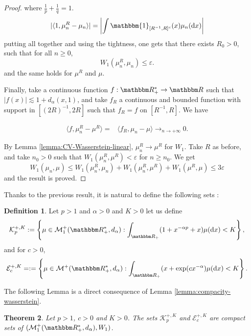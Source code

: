 \documentclass[a4paper,11pt, reqno]{amsart}
\newcommand{\cE}{\mathcal{E}}	\newcommand{\EE}{\mathbbm{E}}
\newcommand{\cK}{\mathcal{K}}	\newcommand{\KK}{\mathbbm{K}}
\newcommand{\cM}{\mathcal{M}}	\newcommand{\MM}{\mathbbm{M}}
\newcommand{\eps}{\varepsilon}
\newcommand{\dd}{\mathop{}\!\mathrm{d}}
\newcommand{\1}{\mathbbm{1}}
\newcommand{\assign}{:=}
\theoremstyle{plain}
\newtheorem{theorem}{Theorem}[section]
\theoremstyle{definition}
\newtheorem{definition}[theorem]{Definition}
\begin{document}
\begin{proof}
  where $\frac{1}{p} + \frac{1}{q} = 1$.
  \[ | \langle 1, \mu_n^R - \mu_n \rangle | = \left| \int \1_{[R^{-
     1}, R]^c} (x) \mu_n (\dd x) \right| \]
  putting all together and using the tightness, one gets that there exists
  $R_0 > 0$, such that for all $n \ge 0$,
  \[ W_1 (\mu_n^R, \mu_n) \le \eps . \]
  and the same holds for $\mu^R$ and $\mu$.
  
  Finally, take a continuous function $f : \RR_+^{\ast} \rightarrow
  \RR$ such that $| f (x) | \lesssim 1 + d_{\alpha} (x, 1)$, and take
  $f_R$ a continuous and bounded function with support in $[(2 R)^{- 1}, 2 R]$
  such that $f_R = f$ on $[R^{- 1}, R]$. We have
  
  \begin{align*}
    \langle f, \mu_n^R - \mu^R \rangle = & \langle f_R, \mu_n - \mu \rangle
    \to_{n \rightarrow + \infty} 0.
  \end{align*}
  
  By Lemma \ref{lemma:CV-Wasserstein-linear}, $\mu_n^R \rightarrow \mu^R$ for
  $W_1$. Take $R$ as before, and take $n_0 > 0$ such that $W_1 (\mu_n^R,
  \mu^R) < \eps$ for $n \ge n_0$. We get
  \[ W_1 (\mu_n, \mu) \le W_1 (\mu_n^R, \mu_n) + W_1 (\mu_n^R, \mu^R) +
     W_1 (\mu^R, \mu) \le 3 \eps \]
  and the result is proved.
\end{proof}

Thanks to the previous result, it is natural to define the following sets :

\begin{definition}
  Let $p > 1$ and $\alpha > 0$ and $K > 0$ let us define
  \[ \cK^{+, K}_p \assign \left\{ \mu \in \cM_1^+
     (\RR_+^{\ast}, d_{\alpha}) : \int_{\RR_+} (1 + x^{- \alpha
     p} + x) \mu (\dd x) < K \right\}, \]
     and for $c>0$, 
     \[\cE^{+,K}_c = \assign \left\{ \mu \in \cM^+(\RR_+^{\ast}, d_{\alpha}) :  
      \int_{\RR_+} (x + \exp(c x^{- \alpha
     } ) \mu (\dd x) < K \right\}.\]
\end{definition}

The following Lemma is a direct consequence of Lemma \ref{lemma:compacity-wasserstein}.
\begin{theorem}\label{theorem:compacity-wasserstein}
    Let $p>1$, $c>0$ and $K>0$. The sets $\cK^{+,K}_p$ and $\cE^{+,K}_c$ are compact sets of $(\cM^+_1(\RR_+^*,d_\alpha),W_1)$.
\end{theorem}
\end{document}
